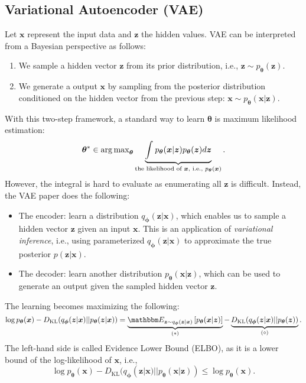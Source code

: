 \subsection{Variational Autoencoder (VAE)}
Let $\bm{x}$ represent the input data and $\bm{z}$ the hidden values. 
VAE can be interpreted from a Bayesian perspective as follows:
    \begin{enumerate}
        \item We sample a hidden vector $\bm{z}$ from its prior distribution, i.e., $\bm{z} \sim p_{\bm{\theta}}(\bm{z})$.
        \item We generate a output $\bm{x}$ by sampling from the posterior distribution conditioned on the hidden vector from the previous step:  $\bm{x} \sim p_{\bm{\theta}}(\bm{x} | \bm{z})$.
    \end{enumerate}
With this two-step framework, a standard way to learn $\bm{\theta}$ is maximum likelihood estimation:
    \begin{equation}
        \bm{\theta}^\ast \in \operatorname{arg\,max}_{\bm{\theta}} \underbrace{ \int_{}^{}{p_{  \bm{\theta}}(\bm{x} | \bm{z}) p_{\bm{\theta}}(\bm{z})} d \bm{z} }_{\text{the likelihood of $\bm{x}$, i.e., $p_{\bm{\theta}}(\bm{x})$}}.
    \end{equation}
However, the integral is hard to evaluate as enumerating all $\bm{z}$ is difficult.
Instead, the VAE paper does the following:
    \begin{itemize}
        \item The encoder: learn a distribution $q_{\bm{\phi}}(\bm{z} | \bm{x})$, which enables us to sample a hidden vector $\bm{z}$ given an input $\bm{x}$.
        This is an application of \emph{variational inference}, i.e., using parameterized $q_{\bm{\phi}}(\bm{z} | \bm{x})$ to approximate the true posterior $p(\bm{z} | \bm{x})$.
        \item The decoder: learn another distribution $p_{\bm{\theta}}(\bm{x} | \bm{z})$, which can be used to generate an output given the sampled hidden vector $\bm{z}$.
    \end{itemize}
The learning becomes maximizing the following:
    \begin{equation}\label{vae:obj}
        \log p_{\bm{\theta}}(\bm{x}) - D_\text{KL}(q_{\bm{\phi}}(\bm{z} | \bm{x}) || p_{\bm{\theta}}(\bm{z} | \bm{x})) = 
        \underbrace{\E_{\bm{z} \sim q_{\bm{\phi}}(\bm{z} | \bm{x})}\left[ p_{\bm{\theta}}(\bm{x} | \bm{z}) \right]}_{(\ast)} - \underbrace{D_\text{KL}(q_{\bm{\phi}}(\bm{z} | \bm{x}) || p_{\bm{\theta}}(\bm{z}))}_{(\diamond)}.
    \end{equation}
The left-hand side is called Evidence Lower Bound (ELBO), as it is a lower bound of the log-likelihood of $\bm{x}$, i.e.,
    \begin{equation}
        \log p_{\bm{\theta}}(\bm{x}) - D_\text{KL}(q_{\bm{\phi}}(\bm{z} | \bm{x})  ||  p_{\bm{\theta}}(\bm{x} | \bm{z})) \le \log p_{\bm{\theta}}(\bm{x}).
    \end{equation}

